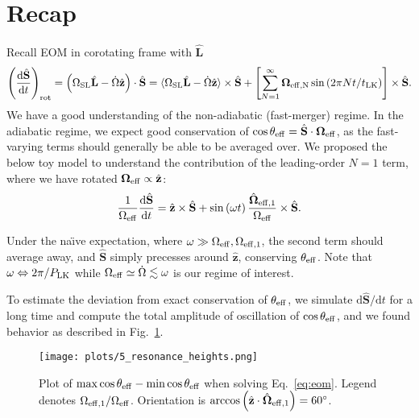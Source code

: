 \documentclass[11pt,
        usenames, %
        dvipsnames %
    ]{article}
\newcommand*{\rd}[2]{\frac{\mathrm{d}#1}{\mathrm{d}#2}}
\newcommand*{\rdil}[2]{\mathrm{d}#1 / \mathrm{d}#2}
\newcommand*{\bm}[1]{\boldsymbol{\mathbf{#1}}}
\newcommand*{\uv}[1]{\hat{\bm{#1}}}
\newcommand*{\ev}[1]{\langle#1\rangle}
\newcommand*{\p}[1]{\left(#1\right)}
\newcommand*{\s}[1]{\left[#1\right]}
\begin{document}
\def\Snospace~{\S{}} %
\renewcommand*{\sectionautorefname}{\Snospace}
\renewcommand*{\appendixautorefname}{\Snospace}
\renewcommand*{\figureautorefname}{Fig.}
\renewcommand*{\equationautorefname}{Eq.}
\renewcommand*{\tableautorefname}{Tab.}

\section{Recap}

Recall EOM in corotating frame with $\uv{L}$
\begin{equation}
    \p{\rd{\uv{S}}{t}}_{\rm rot}
        = \p{\Omega_{\rm SL}\uv{L} - \dot{\Omega} \uv{z}} \cdot \uv{S}
        = \ev{\Omega_{\rm SL}\uv{L} - \dot{\Omega}\uv{z}} \times \uv{S}
        + \s{
            \sum\limits_{N = 1}^\infty \bm{\Omega}_{\rm eff, N}
            \sin\p{2\pi N t / t_{\rm LK}}} \times \uv{S}.\label{eq:eom0}
\end{equation}
We have a good understanding of the non-adiabatic (fast-merger) regime. In the
adiabatic regime, we expect good conservation of $\cos \theta_{\rm eff} =
\uv{S} \cdot \bm{\Omega}_{\rm eff}$, as the fast-varying terms should generally
be able to be averaged over. We proposed the below toy model to understand the
contribution of the leading-order $N = 1$ term, where we have rotated
$\bm{\Omega}_{\rm eff} \propto \uv{z}$:
\begin{equation}
    \frac{1}{\Omega_{\rm eff}}\rd{\uv{S}}{t} = \uv{z} \times \uv{S}
        + \sin \p{\omega t} \frac{\uv{\Omega}_{\rm eff, 1}}{\Omega_{\rm eff}}
            \times \uv{S}.\label{eq:eom}
\end{equation}

Under the na\"\i{}ve expectation, where $\omega \gg \Omega_{\rm eff}, \Omega_{\rm
eff, 1}$, the second term should average away, and $\uv{S}$ simply precesses
around $\uv{z}$, conserving $\theta_{\rm eff}$. Note that $\omega
\Leftrightarrow 2\pi / P_{\rm LK}$ while $\Omega_{\rm eff} \simeq \dot{\Omega}
\lesssim \omega$ is our regime of interest.

To estimate the deviation from exact conservation of $\theta_{\rm eff}$, we
simulate $\rdil{\uv{S}}{t}$ for a long time and compute the total amplitude of
oscillation of $\cos \theta_{\rm eff}$, and we found behavior as described in
Fig.~\ref{fig:resonance_heights}.
\begin{figure}
    \centering
    \texttt{[image: plots/5\_resonance\_heights.png]}
    \caption{Plot of $\max \cos \theta_{\rm eff} - \min \cos \theta_{\rm eff}$
    when solving Eq.~\eqref{eq:eom}. Legend denotes $\Omega_{\rm eff, 1} /
    \Omega_{\rm eff}$. Orientation is $\arccos \p{\uv{z} \cdot \uv{\Omega}_{\rm
    eff, 1}} = 60^\circ$.}\label{fig:resonance_heights}
\end{figure}
\end{document}
